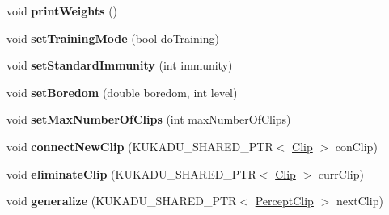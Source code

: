 \begin{DoxyCompactItemize}
\item 
\hypertarget{classkukadu_1_1ProjectiveSimulator_aefa86b1c8c1ec4af765fe4326de58d8e}{void {\bfseries print\-Weights} ()}\label{classkukadu_1_1ProjectiveSimulator_aefa86b1c8c1ec4af765fe4326de58d8e}

\item 
\hypertarget{classkukadu_1_1ProjectiveSimulator_aae63392865e563583bdbe0f4d13f1e15}{void {\bfseries set\-Training\-Mode} (bool do\-Training)}\label{classkukadu_1_1ProjectiveSimulator_aae63392865e563583bdbe0f4d13f1e15}

\item 
\hypertarget{classkukadu_1_1ProjectiveSimulator_a70b1a60ab925ae6e3ea9863f9441316d}{void {\bfseries set\-Standard\-Immunity} (int immunity)}\label{classkukadu_1_1ProjectiveSimulator_a70b1a60ab925ae6e3ea9863f9441316d}

\item 
\hypertarget{classkukadu_1_1ProjectiveSimulator_a4229e8a82d34e153890a5667eb504a18}{void {\bfseries set\-Boredom} (double boredom, int level)}\label{classkukadu_1_1ProjectiveSimulator_a4229e8a82d34e153890a5667eb504a18}

\item 
\hypertarget{classkukadu_1_1ProjectiveSimulator_a6ef831cdb028505f18d3ae4f240c87da}{void {\bfseries set\-Max\-Number\-Of\-Clips} (int max\-Number\-Of\-Clips)}\label{classkukadu_1_1ProjectiveSimulator_a6ef831cdb028505f18d3ae4f240c87da}

\item 
\hypertarget{classkukadu_1_1ProjectiveSimulator_a46b3dadc103c9c4a08ad6ceca15b57b6}{void {\bfseries connect\-New\-Clip} (K\-U\-K\-A\-D\-U\-\_\-\-S\-H\-A\-R\-E\-D\-\_\-\-P\-T\-R$<$ \hyperlink{classkukadu_1_1Clip}{Clip} $>$ con\-Clip)}\label{classkukadu_1_1ProjectiveSimulator_a46b3dadc103c9c4a08ad6ceca15b57b6}

\item 
\hypertarget{classkukadu_1_1ProjectiveSimulator_a86a95c6087dd30be659efbf46408551f}{void {\bfseries eliminate\-Clip} (K\-U\-K\-A\-D\-U\-\_\-\-S\-H\-A\-R\-E\-D\-\_\-\-P\-T\-R$<$ \hyperlink{classkukadu_1_1Clip}{Clip} $>$ curr\-Clip)}\label{classkukadu_1_1ProjectiveSimulator_a86a95c6087dd30be659efbf46408551f}

\item 
\hypertarget{classkukadu_1_1ProjectiveSimulator_af63fed758aeac7a58d99c077ff1e3b61}{void {\bfseries generalize} (K\-U\-K\-A\-D\-U\-\_\-\-S\-H\-A\-R\-E\-D\-\_\-\-P\-T\-R$<$ \hyperlink{classkukadu_1_1PerceptClip}{Percept\-Clip} $>$ next\-Clip)}\label{classkukadu_1_1ProjectiveSimulator_af63fed758aeac7a58d99c077ff1e3b61}


\end{DoxyCompactItemize}
